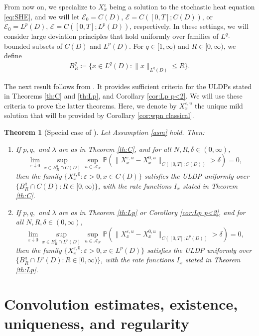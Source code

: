 \documentclass{amsart}
\theoremstyle{plain}
\newtheorem{theorem}{Theorem}[section]
\theoremstyle{remark}
\theoremstyle{plain}
\numberwithin{equation}{section}
\newcommand{\Cper}{C(D)}
\newcommand{\ceqq}{\coloneqq}
\renewcommand{\P}{{\mathbb P}}
\newcommand{\eps}{\varepsilon}
\newcommand{\A}{{\mathcal A}}
\begin{document}
From now on, we specialize to $X^\eps_x$ being a solution to the stochastic heat equation \eqref{eq:SHE}, and we will let $\mathcal{E}_0= C(D)$, $\mathcal{E}=C([0,T];C(D))$, or $\mathcal{E}_0= L^p(D)$, $\mathcal{E}=C([0,T];L^p(D))$, respectively. 
In these settings, we will consider large deviation principles that hold uniformly over  families of $L^q$-bounded subsets of $C(D)$ and $L^p(D)$. For  $q\in[1,\infty)$ and $R\in[0,\infty)$, we define 
\begin{align}\label{eq:BqR}
 B_{R}^{q}\ceqq \{x\in L^q(D) :\|x\|_{L^q(D)}\leq R\}. 
\end{align} 
 
The next result follows from \cite[Th.\ 2.13]{Salins19equivalences}. It provides sufficient criteria for the ULDPs stated in Theorems \ref{th:C} and  \ref{th:Lp}, and Corollary \ref{cor:Lp p<2}. We will use these criteria to prove the latter theorems. Here, we denote by $X_x^{\eps,u}$  the unique mild solution that will be provided by Corollary  \ref{cor:wpn classical}.  

\begin{theorem}[{Special case of \cite[Th.\ 2.13]{Salins19equivalences}}]
\label{th:uldp suff}
Let Assumption \ref{asm} hold. Then:
\begin{enumerate}
  \item If $p,q,$ and $\lambda$ are as in Theorem \ref{th:C},   and for all $N,R,\delta\in( 0,\infty)$, 
\[
\lim_{\eps\downarrow 0}\sup_{x\in B_{R}^q \cap C(D)}\sup_{u\in\A_N}\P(\|X_x^{\eps,u}-X_x^{0,u}\|_{C([0,T];\Cper)}>\delta)=0, 
\]
then the family $\{X_x^{\eps,0}:\eps>0,x\in C(D)\}$ satisfies the ULDP uniformly over $\{B_{R}^q\cap C(D):R\in[0,\infty)\}$,  with the rate functions $I_x$  stated in Theorem \ref{th:C}. 
\item  If $p,q,$ and $\lambda$ are as in Theorem \ref{th:Lp} or Corollary  \ref{cor:Lp p<2}, and for all $N,R,\delta\in( 0,\infty)$,  
    \[
\lim_{\eps\downarrow 0}\sup_{x\in B_R^{q}\cap L^p(D)}\sup_{u\in\A_N}\P(\|X_x^{\eps,u}-X_x^{0,u}\|_{C([0,T];L^p(D))}>\delta)=0,  
\] 
then the family $\{X_x^{\eps,0}:\eps>0,x\in L^p(D)\}$ satisfies the ULDP uniformly over $\{B_{R}^{q}\cap L^p(D):R\in[0,\infty) \}$, with the rate functions $I_x$  stated in Theorem \ref{th:Lp}. 
\end{enumerate}
\end{theorem}

\section{Convolution estimates, existence, uniqueness, and regularity}\label{sec:wpn estimates}
\end{document}
